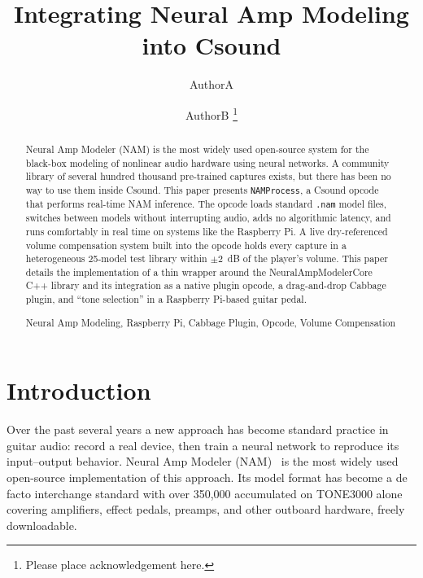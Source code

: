 \documentclass[runningheads,a4paper]{llncs}
\newcommand{\keywords}[1]{\par\addvspace\baselineskip
\noindent\keywordname\enspace\ignorespaces#1}
\begin{document}
\mainmatter

\title{Integrating Neural Amp Modeling into Csound}

\author{AuthorA\and AuthorB \thanks{Please place acknowledgement here.}}

\maketitle

\begin{abstract}
Neural Amp Modeler (NAM) is the most widely used open-source system for
the black-box modeling of nonlinear audio hardware using neural
networks. A community library of several hundred thousand pre-trained
captures exists, but there has been no way to use them inside Csound.
This paper presents \texttt{NAMProcess}, a Csound opcode that performs
real-time NAM inference. The opcode loads standard
\texttt{.nam} model files, switches between models without interrupting audio, adds no algorithmic latency, and runs
comfortably in real time on systems like the Raspberry Pi. A live
dry-referenced volume compensation system built into the opcode holds
every capture in a heterogeneous 25-model test library within $\pm
2$~dB of the player's volume. This paper details the implementation of a thin wrapper around
the NeuralAmpModelerCore C++ library and its integration as a native
plugin opcode, a drag-and-drop Cabbage plugin, and ``tone selection''
in a Raspberry Pi-based guitar pedal.
\keywords{Neural Amp Modeling, Raspberry Pi,
Cabbage Plugin, Opcode, Volume Compensation}
\end{abstract}

\section{Introduction}

Over the past several years a new approach has become standard practice in
guitar audio: record a real device, then train a neural network to
reproduce its input--output behavior. Neural Amp Modeler
(NAM)~\cite{atkinson2025slimmable,nam} is the most widely used
open-source implementation of this approach. Its model format has become a
de facto interchange standard with over 350,000 accumulated on TONE3000
alone~\cite{tone3000} covering amplifiers, effect pedals, preamps, and
other outboard hardware, freely downloadable.
\end{document}
